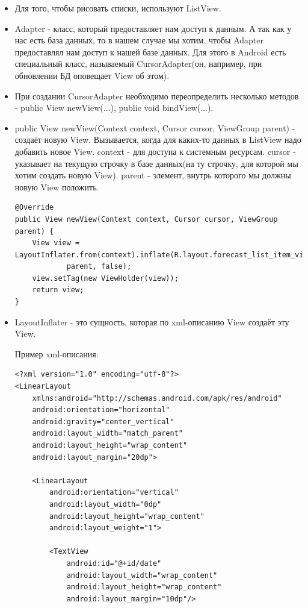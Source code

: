 \documentclass[12 pt]{article}
\begin{document}
    \begin{itemize}
        \item Для того, чтобы рисовать списки, используют ListView.
        \item Adapter - класс, который предоставляет нам доступ к данным. А так как у нас есть база данных, то в нашем случае мы хотим, чтобы Adapter предоставлял нам доступ к нашей базе данных. Для этого в Android есть специальный класс, называемый CursorAdapter(он, например, при обновлении БД оповещает View об этом).
        \item При создании CursorAdapter необходимо переопределить несколько методов - public View newView(...), public void bindView(...).
        \item public View newView(Context context, Cursor cursor, ViewGroup parent) - создаёт новую View. Вызывается, когда для каких-то данных в ListView надо добавить новое View. context - для доступа к системным ресурсам. cursor - указывает на текущую строчку в базе данных(на ту строчку, для которой мы хотим создать новую View). parent - элемент, внутрь которого мы должны новую View положить.
        \begin{lstlisting}
@Override
public View newView(Context context, Cursor cursor, ViewGroup parent) {
    View view = LayoutInflater.from(context).inflate(R.layout.forecast_list_item_view,
            parent, false);
    view.setTag(new ViewHolder(view));
    return view;
}        
        \end{lstlisting}
        \item LayoutInflater - это сущность, которая по xml-описанию View создаёт эту View. 
        
        Пример xml-описания:
        \begin{lstlisting}
<?xml version="1.0" encoding="utf-8"?>
<LinearLayout
    xmlns:android="http://schemas.android.com/apk/res/android"
    android:orientation="horizontal"
    android:gravity="center_vertical"
    android:layout_width="match_parent"
    android:layout_height="wrap_content"
    android:layout_margin="20dp">

    <LinearLayout
        android:orientation="vertical"
        android:layout_width="0dp"
        android:layout_height="wrap_content"
        android:layout_weight="1">

        <TextView
            android:id="@+id/date"
            android:layout_width="wrap_content"
            android:layout_height="wrap_content"
            android:layout_margin="10dp"/>


\end{lstlisting}
\end{itemize}
\end{document}
